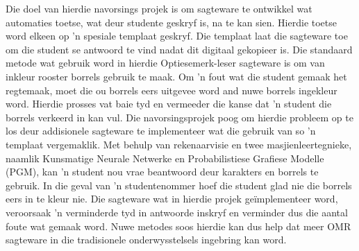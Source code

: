 
\begin{uittreksel}    %
Die doel van hierdie navorsings projek is om sagteware te ontwikkel wat automaties toetse, wat deur studente geskryf is, na te kan sien. Hierdie toetse word elkeen op 'n spesiale templaat geskryf. Die templaat laat die sagteware toe om die student se antwoord te vind nadat dit digitaal gekopieer is. Die standaard metode wat gebruik word in hierdie Optiesemerk-leser sagteware is om van inkleur rooster borrels gebruik te maak. Om 'n fout wat die student gemaak het regtemaak, moet die ou borrels eers uitgevee word and nuwe borrels ingekleur word. Hierdie prosses vat baie tyd en vermeeder die kanse dat 'n student die borrels verkeerd in kan vul. 
Die navorsingsprojek poog om hierdie probleem op te los deur addisionele sagteware te implementeer wat die gebruik van so 'n templaat vergemaklik. Met behulp van rekenaarvisie en twee masjienleertegnieke, naamlik Kunsmatige Neurale Netwerke en Probabilistiese Grafiese Modelle (PGM), kan 'n student nou vrae beantwoord deur karakters en borrels te gebruik. In die geval van 'n studentenommer hoef die student glad nie die borrels eers in te kleur nie. Die sagteware wat in hierdie projek geïmplementeer word, veroorsaak 'n verminderde tyd in antwoorde inskryf en verminder dus die aantal foute wat gemaak word. Nuwe metodes soos hierdie kan dus help dat meer OMR sagteware in die tradisionele onderwysstelsels ingebring kan word.
\end{uittreksel}
